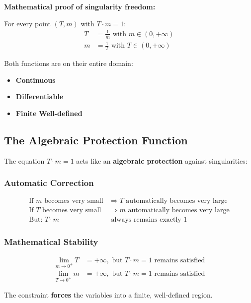 	\textbf{Mathematical proof of singularity freedom:}
	
	For every point $(T,m)$ with $T \cdot m = 1$:
	\begin{align}
		T &= \frac{1}{m} \text{ with } m \in (0, +\infty)\\
		m &= \frac{1}{T} \text{ with } T \in (0, +\infty)
	\end{align}
	
	Both functions are on their entire domain:
	\begin{itemize}
		\item \textbf{Continuous}
		\item \textbf{Differentiable}
		\item \textbf{Finite}
		\textbf{Well-defined}
	\end{itemize}
	
	\subsection{The Algebraic Protection Function}
	
	The equation $T \cdot m = 1$ acts like an \textbf{algebraic protection} against singularities:
	
	\subsubsection{Automatic Correction}
	\begin{align}
		\text{If } m \text{ becomes very small} &\Rightarrow T \text{ automatically becomes very large}\\
		\text{If } T \text{ becomes very small} &\Rightarrow m \text{ automatically becomes very large}\\
		\text{But: } T \cdot m &\text{ always remains exactly } 1
	\end{align}
	
	\subsubsection{Mathematical Stability}
	\begin{align}
		\lim_{m \to 0^+} T &= +\infty, \text{ but } T \cdot m = 1 \text{ remains satisfied}\\
		\lim_{T \to 0^+} m &= +\infty, \text{ but } T \cdot m = 1 \text{ remains satisfied}
	\end{align}
	
	The constraint \textbf{forces} the variables into a finite, well-defined region.
	
